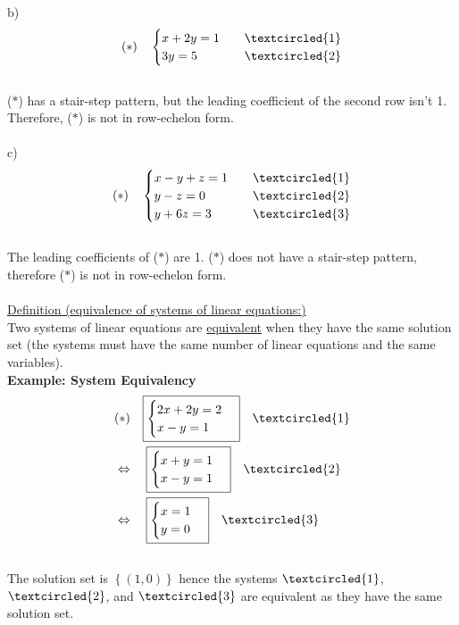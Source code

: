 \documentclass{jhwhw}
\begin{document}
b) \begin{align*} 
(\ast) \quad \begin{cases} x+2y=1 & \quad \textcircled{1} \\ 3y=5 & \quad \textcircled{2} \end{cases}
\end{align*}
\\
(\(\ast\)) has a stair-step pattern, but the leading coefficient of the second row isn't 1. Therefore, (\(\ast\)) is not in row-echelon form.
\\ \\

c) \begin{align*} 
(\ast) \quad \begin{cases} x-y+z=1 & \quad \textcircled{1} \\ y-z=0 & \quad \textcircled{2} \\ y+6z=3 & \quad \textcircled{3} \end{cases}
\end{align*}
\\
The leading coefficients of (\(\ast\)) are 1. (\(\ast\)) does not have a stair-step pattern, therefore (\(\ast\)) is not in row-echelon form.
\\ \\

\underline{Definition (equivalence of systems of linear equations:)}
\\

Two systems of linear equations are \underline{equivalent} when they have the same solution set (the systems must have the same number of linear equations and the same variables).
\\

\textbf{Example: System Equivalency}
\\
\begin{align*} 
&(\ast) \quad \boxed{\begin{cases} 2x+2y=2 \\ x-y=1 \end{cases}} \quad \textcircled{1}\\
&\Leftrightarrow \quad \boxed{\begin{cases} x+y=1 \\ x-y=1 \end{cases}} \quad \textcircled{2}\\
&\Leftrightarrow \quad \boxed{\begin{cases} x=1 \\ y=0 \end{cases}} \quad \textcircled{3}
\end{align*}
\\
The solution set is \(\left\{(1,0)\right\}\) hence the systems \(\textcircled{1}\), \(\textcircled{2}\), and \(\textcircled{3}\) are equivalent as they have the same solution set.
\\
\end{document}
